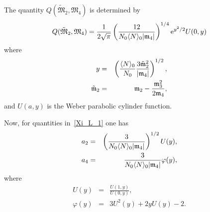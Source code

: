 The quantity $Q(\tilde{\mathfrak{M}}_2, \mathfrak{M}_4)$ is determined by
\begin{equation*}
	\label{quantity_Q}
	Q(\tilde{\mathfrak{M}}_2, \mathfrak{M}_4) = \frac{1}{2\sqrt{\pi}} \left(\frac{12}{N_0 \langle N \rangle_0\abs{\mathfrak{m}_4}}\right)^{1/4} {\rm e}^{y^2/2} U(0,y)
\end{equation*}
where
\begin{eqnarray*}
	y & = & \left(\frac{\langle N \rangle_0}{N_0} \frac{3\tilde{\mathfrak{m}}_2^2}{\abs{\mathfrak{m}_4}}\right)^{1/2},
	\\
	\tilde{\mathfrak{m}}_2 & = & \mathfrak{m}_2 - \frac{\mathfrak{m}_3^2}{2\mathfrak{m}_4},
\end{eqnarray*}
and $U(a, y)$ is the Weber parabolic cylinder function.

Now, for quantities in~\eqref{Xi_L_1} one has
\begin{eqnarray*}
	a_2 & = & \left(\frac{3}{N_0 \langle N \rangle_0 \abs{\mathfrak{m}_4}}\right)^{1/2} U(y),
	\\
	a_4 & = & \frac{3}{N_0 \langle N \rangle_0 \abs{\mathfrak{m}_4}} \varphi(y),
\end{eqnarray*}
where
\begin{eqnarray*}
	U(y) & = & \frac{U(1,y)}{U(0,y)},
	\\
	\varphi(y) & = & 3U^2(y) + 2yU(y) -2.
\end{eqnarray*}